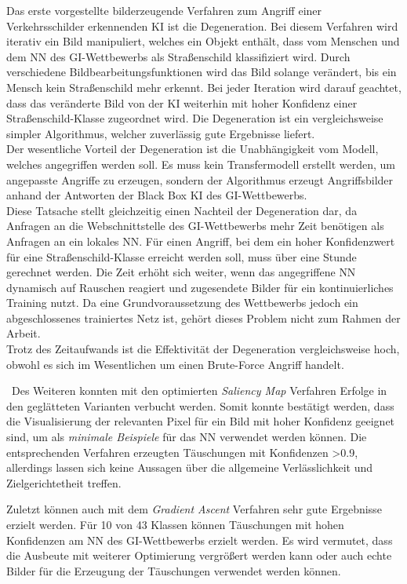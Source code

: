Das erste vorgestellte bilderzeugende Verfahren zum Angriff einer Verkehrsschilder erkennenden \ac{KI} ist die Degeneration. Bei diesem Verfahren wird iterativ ein Bild manipuliert, welches ein Objekt enthält, dass vom Menschen und dem \ac{NN} des \ac{GI}-Wettbewerbs als Straßenschild klassifiziert wird. Durch verschiedene Bildbearbeitungsfunktionen wird das Bild solange verändert, bis ein Mensch kein Straßenschild mehr erkennt. Bei jeder Iteration wird darauf geachtet, dass das veränderte Bild von der \ac{KI} weiterhin mit hoher Konfidenz einer Straßenschild-Klasse zugeordnet wird. Die Degeneration ist ein vergleichsweise simpler Algorithmus, welcher zuverlässig gute Ergebnisse liefert.\\ 
Der wesentliche Vorteil der Degeneration ist die Unabhängigkeit vom Modell, welches angegriffen werden soll. Es muss kein Transfermodell erstellt werden, um angepasste Angriffe zu erzeugen, sondern der Algorithmus erzeugt Angriffsbilder anhand der Antworten der Black Box \ac{KI} des \ac{GI}-Wettbewerbs.\\
Diese Tatsache stellt gleichzeitig einen Nachteil der Degeneration dar, da Anfragen an die Webschnittstelle des \ac{GI}-Wettbewerbs mehr Zeit benötigen als Anfragen an ein lokales \ac{NN}. Für einen Angriff, bei dem ein hoher Konfidenzwert für eine Straßenschild-Klasse erreicht werden soll, muss über eine Stunde gerechnet werden. Die Zeit erhöht sich weiter, wenn das angegriffene \ac{NN} dynamisch auf Rauschen reagiert und zugesendete Bilder für ein kontinuierliches Training nutzt. Da eine Grundvoraussetzung des Wettbewerbs jedoch ein abgeschlossenes trainiertes Netz ist, gehört dieses Problem nicht zum Rahmen der Arbeit. \\
Trotz des Zeitaufwands ist die Effektivität der Degeneration vergleichsweise hoch, obwohl es sich im Wesentlichen um einen Brute-Force Angriff handelt. 

~\newline Des Weiteren konnten mit den optimierten \textit{Saliency Map} Verfahren Erfolge in den geglätteten Varianten verbucht werden. Somit konnte bestätigt werden, dass die Visualisierung der relevanten Pixel für ein Bild mit hoher Konfidenz geeignet sind, um als \textit{minimale Beispiele} für das NN verwendet werden können. 
Die entsprechenden Verfahren erzeugten Täuschungen mit Konfidenzen >0.9, allerdings lassen sich keine Aussagen über die allgemeine Verlässlichkeit und Zielgerichtetheit treffen.

Zuletzt können auch mit dem \textit{Gradient Ascent} Verfahren sehr gute Ergebnisse erzielt werden. Für 10 von 43 Klassen können Täuschungen mit hohen Konfidenzen am \ac{NN} des \ac{GI}-Wettbewerbs erzielt werden. Es wird vermutet, dass die Ausbeute mit weiterer Optimierung vergrößert werden kann oder auch echte Bilder für die Erzeugung der Täuschungen verwendet werden können. 


